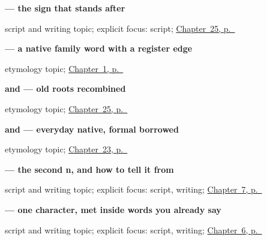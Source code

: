 \noindent\begin{minipage}[t]{\linewidth}
\raggedright
\textbf{ — the sign that stands after}\par
\footnotesize script and writing topic; explicit focus: script; \hyperref[ch:ta-good-night]{Chapter~25, p.~\pageref*{ch:ta-good-night}}
\end{minipage}\par\smallskip

\noindent\begin{minipage}[t]{\linewidth}
\raggedright
\textbf{ — a native family word with a register edge}\par
\footnotesize etymology topic; \hyperref[ch:greetings]{Chapter~1, p.~\pageref*{ch:greetings}}
\end{minipage}\par\smallskip

\noindent\begin{minipage}[t]{\linewidth}
\raggedright
\textbf{  and   — old roots recombined}\par
\footnotesize etymology topic; \hyperref[ch:ta-good-night]{Chapter~25, p.~\pageref*{ch:ta-good-night}}
\end{minipage}\par\smallskip

\noindent\begin{minipage}[t]{\linewidth}
\raggedright
\textbf{ and  — everyday native, formal borrowed}\par
\footnotesize etymology topic; \hyperref[ch:ta-day]{Chapter~23, p.~\pageref*{ch:ta-day}}
\end{minipage}\par\smallskip

\noindent\begin{minipage}[t]{\linewidth}
\raggedright
\textbf{ — the second n, and how to tell it from }\par
\footnotesize script and writing topic; explicit focus: script, writing; \hyperref[ch:ta-numbers-one-to-ten]{Chapter~7, p.~\pageref*{ch:ta-numbers-one-to-ten}}
\end{minipage}\par\smallskip

\noindent\begin{minipage}[t]{\linewidth}
\raggedright
\textbf{ — one character, met inside words you already say}\par
\footnotesize script and writing topic; explicit focus: script, writing; \hyperref[ch:ta-dative-case]{Chapter~6, p.~\pageref*{ch:ta-dative-case}}
\end{minipage}\par\smallskip

